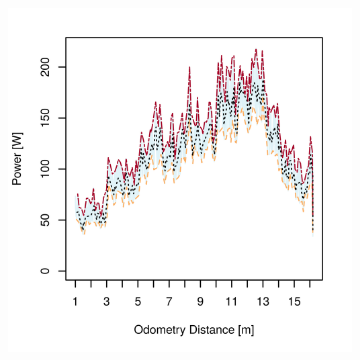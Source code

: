\clearpage
\begin{figure}[h]
\captionsetup[subfigure]{justification=centering}
\vspace{-1ex}
	\centering
    \setlength{\subfigureWidth}{0.32\textwidth}
    \setlength{\graphicsHeight}{50mm}
    \hypersetup{hidelinks=true}%
	\begin{subfigure}[t]{\subfigureWidth}
        \centering
        \includegraphics[height=\graphicsHeight]{sections/power-system-design/power-budget/plots/locomotion-power-draw-on-upslope-terrain.png}
		\label{fig:plot:sub:sherpatt-disaggregated-upslope-terrain-power-draw-locomotion}
	\end{subfigure}\hfill
	\begin{subfigure}[t]{\subfigureWidth}
        \centering

\end{subfigure}
\end{figure}
